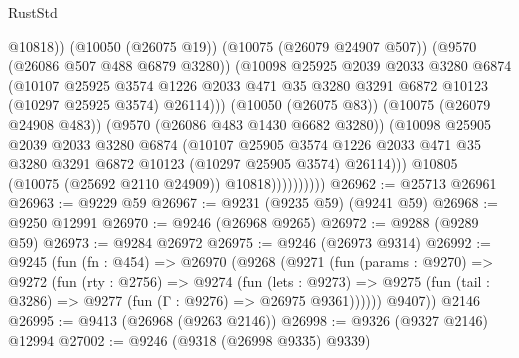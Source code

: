 \begin{lexlean}{RustStd}
\begin{coremodule}
                                @10818))
                            (@10050 (@26075 @19))
                            (@10075 (@26079 @24907 @507))
                            (@9570 (@26086 @507 @488 @6879 @3280))
                            (@10098
                              @25925
                              @2039
                              @2033
                              @3280
                              @6874
                              (@10107
                                @25925
                                @3574
                                @1226
                                @2033
                                @471
                                @35
                                @3280
                                @3291
                                @6872
                                @10123
                                (@10297 @25925 @3574)
                                @26114)))
                          (@10050 (@26075 @83))
                          (@10075 (@26079 @24908 @483))
                          (@9570 (@26086 @483 @1430 @6682 @3280))
                          (@10098
                            @25905
                            @2039
                            @2033
                            @3280
                            @6874
                            (@10107
                              @25905
                              @3574
                              @1226
                              @2033
                              @471
                              @35
                              @3280
                              @3291
                              @6872
                              @10123
                              (@10297 @25905 @3574)
                              @26114)))
                        @10805
                        (@10075 (@25692 @2110 @24909))
                        @10818))))))))))
@26962 := @25713 @26961
@26963 := @9229 @59
@26967 := @9231 (@9235 @59) (@9241 @59)
@26968 := @9250 @12991
@26970 := @9246 (@26968 @9265)
@26972 := @9288 (@9289 @59)
@26973 := @9284 @26972
@26975 := @9246 (@26973 @9314)
@26992 := @9245
    (fun (fn : @454) =>
    @26970
      (@9268
        (@9271
          (fun (params : @9270) =>
          @9272
            (fun (rty : @2756) =>
            @9274
              (fun (lets : @9273) =>
              @9275 (fun (tail : @3286) => @9277 (fun (Γ : @9276) => @26975 @9361))))))
        @9407))
    @2146
@26995 := @9413 (@26968 (@9263 @2146))
@26998 := @9326 (@9327 @2146) @12994
@27002 := @9246 (@9318 (@26998 @9335) @9339)

\end{coremodule}
\end{lexlean}
